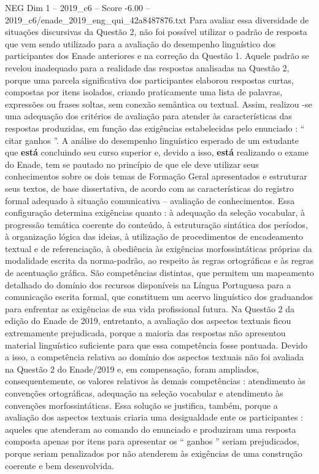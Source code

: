 \begin{textsample}{NEG Dim 1 – 2019\_c6 – Score -6.00 – 2019\_c6/enade\_2019\_eng\_qui\_42a8487876.txt}
Para avaliar essa diversidade de situações discursivas da Questão 2, não foi possível utilizar o padrão de resposta que vem sendo utilizado para a avaliação do desempenho linguístico dos participantes dos Enade anteriores e na correção da Questão 1.
Aquele padrão se revelou inadequado para a realidade das respostas analisadas na Questão 2, porque uma parcela significativa dos participantes elaborou respostas curtas, compostas por itens isolados, criando praticamente uma lista de palavras, expressões ou frases soltas, sem conexão semântica ou textual.
Assim, realizou -se uma adequação dos critérios de avaliação para atender às características das respostas produzidas, em função das exigências estabelecidas pelo enunciado : “ citar ganhos ”.
A análise do desempenho linguístico esperado de um estudante que \textbf{está} concluindo seu curso superior e, devido a isso, \textbf{está} realizando o exame do Enade, tem se pautado no princípio de que ele deve utilizar seus conhecimentos sobre os dois temas de Formação Geral apresentados e estruturar seus textos, de base dissertativa, de acordo com as características do registro formal adequado à situação comunicativa – avaliação de conhecimentos.
Essa configuração determina exigências quanto : à adequação da seleção vocabular, à progressão temática coerente do conteúdo, à estruturação sintática dos períodos, à organização lógica das ideias, à utilização de procedimentos de encadeamento textual e de referenciação, à obediência às exigências morfossintáticas próprias da modalidade escrita da norma-padrão, ao respeito às regras ortográficas e às regras de acentuação gráfica.
São competências distintas, que permitem um mapeamento detalhado do domínio dos recursos disponíveis na Língua Portuguesa para a comunicação escrita formal, que constituem um acervo linguístico dos graduandos para enfrentar as exigências de sua vida profissional futura.
Na Questão 2 da edição do Enade de 2019, entretanto, a avaliação dos aspectos textuais ficou extremamente prejudicada, porque a maioria das respostas não apresentou material linguístico suficiente para que essa competência fosse pontuada.
Devido a isso, a competência relativa ao domínio dos aspectos textuais não foi avaliada na Questão 2 do Enade/2019 e, em compensação, foram ampliados, consequentemente, os valores relativos às demais competências : atendimento às convenções ortográficas, adequação na seleção vocabular e atendimento às convenções morfossintáticas.
Essa solução se justifica, também, porque a avaliação dos aspectos textuais criaria uma desigualdade ente os participantes : aqueles que atenderam ao comando do enunciado e produziram uma resposta composta apenas por itens para apresentar os “ ganhos ” seriam prejudicados, porque seriam penalizados por não atenderem às exigências de uma construção coerente e bem desenvolvida.

\end{textsample}
